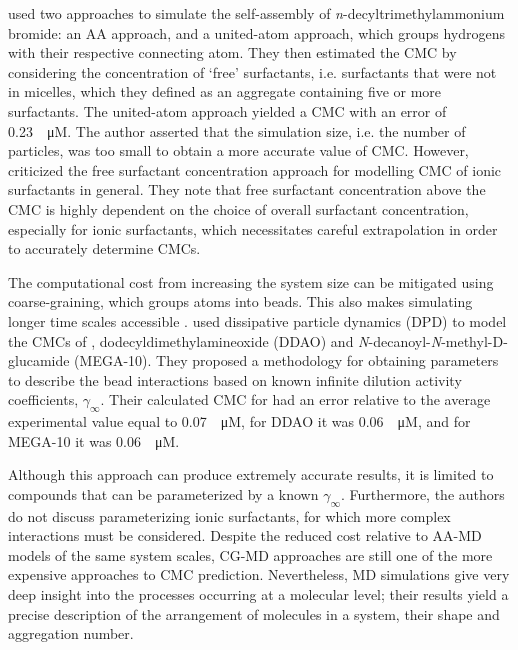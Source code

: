 \citet{jorgeMolecularDynamicsSimulation2008} used two approaches to simulate the
self-assembly of \textit{n}-decyltrimethylammonium bromide: an AA approach, and
a united-atom approach, which groups hydrogens with their respective connecting
atom. They then estimated the CMC by considering the concentration of `free'
surfactants, i.e. surfactants that were not in micelles, which they defined as
an aggregate containing five or more surfactants. The united-atom approach
yielded a CMC with an error of \SI{0.23}{\log \micro M}. The author asserted
that the simulation size, i.e. the number of particles, was too small to obtain
a more accurate value of CMC. However,
\citet{jusufiExplicitImplicitSolventSimulations2015} criticized the free
surfactant concentration approach for modelling CMC of ionic surfactants in
general. They note that free surfactant concentration above the CMC is highly
dependent on the choice of overall surfactant concentration, especially for
ionic surfactants, which necessitates careful extrapolation in order to
accurately determine CMCs.

The computational cost from increasing the system size can be mitigated using
coarse-graining, which groups atoms into beads. This also makes simulating
longer time scales accessible
\cite{fitzgeraldMultiscaleModelingNanomaterials2015}.
\citet{vishnyakovPredictionCriticalMicelle2013} used dissipative particle
dynamics (DPD) to model the CMCs of , dodecyldimethylamineoxide (DDAO)
and \textit{N}-decanoyl-\textit{N}-methyl-\textsc{D}-glucamide (MEGA-10). They
proposed a methodology for obtaining parameters to describe the bead
interactions based on known infinite dilution activity coefficients,
$\gamma_\infty$. Their calculated CMC for  had an error relative to the
average experimental value equal to \SI{0.07}{\log \micro M}, for DDAO it was
\SI{0.06}{\log \micro M}, and for MEGA-10 it was \SI{0.06}{\log \micro M}.

Although this approach can produce extremely accurate results, it is limited to
compounds that can be parameterized by a known $\gamma_\infty$. Furthermore, the
authors do not discuss parameterizing ionic surfactants, for which more complex
interactions must be considered. Despite the reduced cost relative to AA-MD
models of the same system scales, CG-MD approaches are still one of the more
expensive approaches to CMC prediction. Nevertheless, MD simulations give very
deep insight into the processes occurring at a molecular level; their results
yield a precise description of the arrangement of molecules in a system, their
shape and aggregation number.

